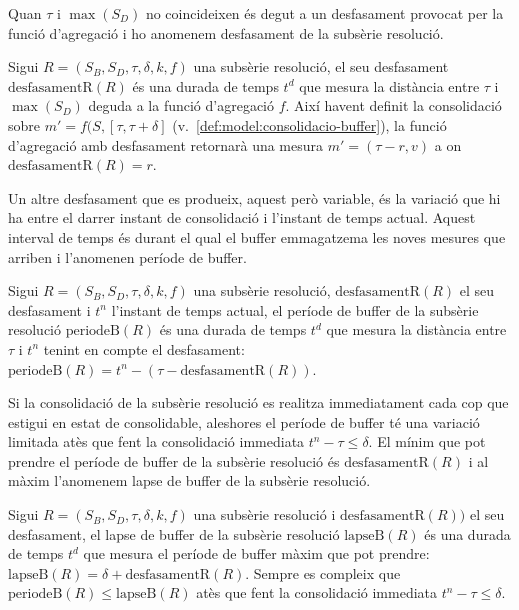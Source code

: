 Quan $\tau$ i $\max(S_D)$ no coincideixen és degut a un desfasament
provocat per la funció d'agregació i ho anomenem desfasament de la
subsèrie resolució.
\begin{definition} %
  Sigui $R=(S_B,S_D,\tau,\delta,k,f)$ una subsèrie resolució, el seu
  desfasament $\text{desfasamentR}(R)$ és una durada de temps $t^d$
  que mesura la distància entre $\tau$ i $\max(S_D)$ deguda a la
  funció d'agregació $f$. Així havent definit la consolidació sobre
  $m'=f(S,[\tau,\tau+\delta]$
  (v.~\autoref{def:model:consolidacio-buffer}), la funció d'agregació
  amb desfasament retornarà una mesura $m'=(\tau - r,v)$ a on
  $\text{desfasamentR}(R) = r$.
\end{definition}


Un altre desfasament que es produeix, aquest però variable, és la
variació que hi ha entre el darrer instant de consolidació i l'instant
de temps actual. Aquest interval de temps és durant el qual el buffer
emmagatzema les noves mesures que arriben i l'anomenen període de
buffer.
\begin{definition}
  Sigui $R=(S_B,S_D,\tau,\delta,k,f)$ una subsèrie resolució,
  $\text{desfasamentR}(R)$ el seu desfasament i $t^n$ l'instant de
  temps actual, el període de buffer de la subsèrie resolució
  $\text{periodeB}(R)$ és una durada de temps $t^d$ que mesura la
  distància entre $\tau$ i $t^n$ tenint en compte el desfasament:
  $\text{periodeB}(R) = t^n - (\tau - \text{desfasamentR}(R))$.
\end{definition}

Si la consolidació de la subsèrie resolució es realitza immediatament
cada cop que estigui en estat de consolidable, aleshores el període de
buffer té una variació limitada atès que fent la consolidació
immediata $t^n - \tau \leq \delta$. El mínim que pot prendre el
període de buffer de la subsèrie resolució és $\text{desfasamentR}(R)$
i al màxim l'anomenem lapse de buffer de la subsèrie resolució.
\begin{definition}
  Sigui $R=(S_B,S_D,\tau,\delta,k,f)$ una subsèrie resolució i
  $\text{desfasamentR}(R))$ el seu desfasament, el lapse de buffer de
  la subsèrie resolució $\text{lapseB}(R)$ és una durada de temps
  $t^d$ que mesura el període de buffer màxim que pot prendre:
  $\text{lapseB}(R) = \delta + \text{desfasamentR}(R)$.  Sempre es
  compleix que $\text{periodeB}(R) \leq \text{lapseB}(R)$ atès que
  fent la consolidació immediata $t^n - \tau \leq \delta$.
\end{definition}



